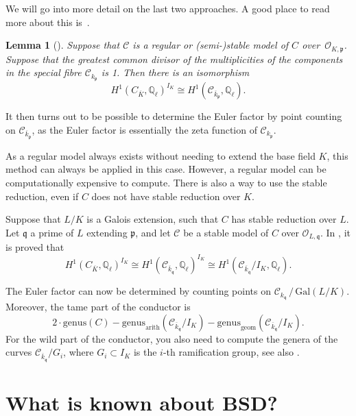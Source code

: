 \documentclass[12pt]{article}
\newtheorem{lemma}[theorem]{Lemma}
\theoremstyle{definition}
\numberwithin{equation}{subsection}
\newcommand{\Q}{\ensuremath{\mathbb{Q}}}
\begin{document}
We will go into more detail on the last two approaches. A good place to read more about this is~\cite{BouwWewers}.

\begin{lemma}[\textrm{\cite[Prop.\ 2.8]{BouwWewers}}]
Suppose that $\mathcal{C}$ is a regular or (semi-)stable model of $C$ over~$\mathcal{O}_{K,\mathfrak{p}}$.
Suppose that the greatest common divisor of the multiplicities of the components in the special fibre $\mathcal{C}_{k_{\mathfrak{p}}}$ is 1.
Then there is an isomorphism
$$H^1(C_{\overline{K}}, \Q_{\ell})^{I_K} \cong H^1(\mathcal{C}_{\overline{k}_\mathfrak{p}}, \Q_\ell).$$
\end{lemma}

It then turns out to be possible to determine the Euler factor by point counting on $\mathcal{C}_{\overline{k}_\mathfrak{p}}$, as the Euler factor is essentially the zeta function of $\mathcal{C}_{k_\mathfrak{p}}$.

As a regular model always exists without needing to extend the base field $K$, this method can always be applied in this case.
However, a regular model can be computationally expensive to compute.
There is also a way to use the stable reduction, even if $C$ does not have stable reduction over $K$.

Suppose that $L/K$ is a Galois extension, such that $C$ has stable reduction over $L$.
Let $\mathfrak{q}$ a prime of $L$ extending $\mathfrak{p}$, and let $\mathcal{C}$ be a stable model of $C$ over $\mathcal{O}_{L,\mathfrak{q}}$.
In \cite[Thm.\ 2.4]{BouwWewers}, it is proved that
$$H^1(C_{\overline{K}}, \Q_{\ell})^{I_K} \cong H^1(\mathcal{C}_{\overline{k}_\mathfrak{q}}, \Q_\ell)^{I_K} \cong H^1(\mathcal{C}_{\overline{k}_\mathfrak{q}} / I_{K}, \Q_{\ell}).$$

The Euler factor can now be determined by counting points on $\mathcal{C}_{k_\mathfrak{q}} \,/\, \mathrm{Gal}(L/K)$.
Moreover, the tame part of the conductor is
$$2 \cdot \mathrm{genus}(C) - \mathrm{genus}_{\mathrm{arith}}(\mathcal{C}_{\overline{k}_\mathfrak{q}} / I_{K}) - \mathrm{genus}_{\mathrm{geom}}(\mathcal{C}_{\overline{k}_\mathfrak{q}} / I_{K}).$$
For the wild part of the conductor, you also need to compute the genera of the curves $\mathcal{C}_{\overline{k}_\mathfrak{q}} / G_i$, where $G_i \subset I_{K}$ is the $i$-th ramification group, see also \cite[Thm.\ 2.9]{BouwWewers}.

\section{What is known about BSD?}
\end{document}
